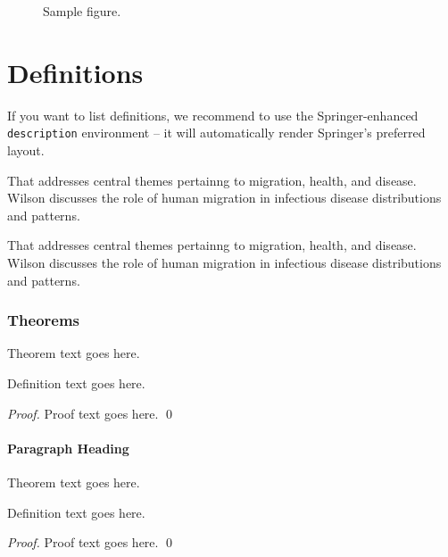\documentclass[graybox, natbib, nosecnum, twocolumn]{svmult}
\begin{document}
{%
%
\begin{figure}
%
%
\caption{Sample figure.}
\label{fig:1}       %
\end{figure}

\section{Definitions}
If you want to list definitions, we recommend to use the Springer-enhanced \verb|description| environment -- it will automatically render Springer's preferred layout.

\begin{description}[Type 1]
\item[Type 1]{That addresses central themes pertainng to migration, health, and disease. Wilson discusses the role of human migration in infectious disease distributions and patterns.}
\item[Type 2]{That addresses central themes pertainng to migration, health, and disease. Wilson discusses the role of human migration in infectious disease distributions and patterns.}
\end{description}

\subsubsection{Theorems}

\begin{theorem}
Theorem text goes here.
\end{theorem}
%
%
\begin{definition}
Definition text goes here.
\end{definition}

\begin{proof}
Proof text goes here.
\qed
\end{proof}

\paragraph{Paragraph Heading} %
%
%
\begin{theorem}
Theorem text goes here.
\end{theorem}
%
\begin{definition}
Definition text goes here.
\end{definition}
%
\begin{proof}
\smartqed
Proof text goes here.
\qed
\end{proof}
}
\end{document}
